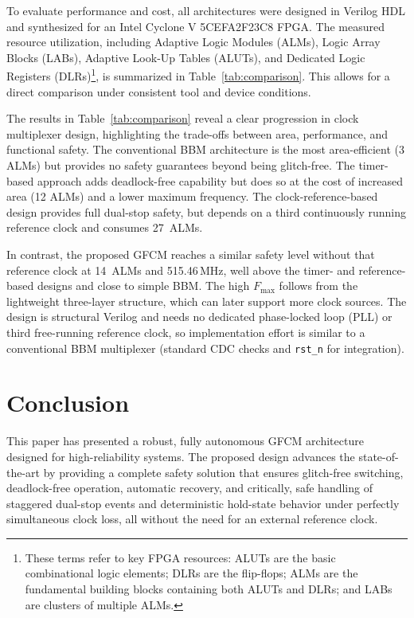 \documentclass[conference]{IEEEtran}
\begin{document}
To evaluate performance and cost, all architectures were designed in Verilog HDL and synthesized for an Intel Cyclone V 5CEFA2F23C8 FPGA. The measured resource utilization, including Adaptive Logic Modules (ALMs), Logic Array Blocks (LABs), Adaptive Look-Up Tables (ALUTs), and Dedicated Logic Registers (DLRs)\footnote{These terms refer to key FPGA resources: ALUTs are the basic combinational logic elements; DLRs are the flip-flops; ALMs are the fundamental building blocks containing both ALUTs and DLRs; and LABs are clusters of multiple ALMs.}, is summarized in Table~\ref{tab:comparison}. This allows for a direct comparison under consistent tool and device conditions.

The results in Table~\ref{tab:comparison} reveal a clear progression in clock multiplexer design, highlighting the trade-offs between area, performance, and functional safety. The conventional BBM architecture \cite{harris2012digital} is the most area-efficient (3 ALMs) but provides no safety guarantees beyond being glitch-free. The timer-based approach \cite{9217816} adds deadlock-free capability but does so at the cost of increased area (12 ALMs) and a lower maximum frequency.
The clock-reference-based design \cite{11424085} provides full dual-stop safety, but depends on a third continuously running reference clock and consumes 27~ALMs.

In contrast, the proposed GFCM reaches a similar safety level without that reference clock at 14~ALMs and 515.46\,MHz, well above the timer- and reference-based designs and close to simple BBM. The high $F_{\max}$ follows from the lightweight three-layer structure, which can later support more clock sources. The design is structural Verilog and needs no dedicated phase-locked loop (PLL) or third free-running reference clock, so implementation effort is similar to a conventional BBM multiplexer (standard CDC checks and \texttt{rst\_n} for integration).

\section{Conclusion}
\label{sec:conclusion}

This paper has presented a robust, fully autonomous GFCM architecture designed for high-reliability systems. The proposed design advances the state-of-the-art by providing a complete safety solution that ensures glitch-free switching, deadlock-free operation, automatic recovery, and critically, safe handling of staggered dual-stop events and deterministic hold-state behavior under perfectly simultaneous clock loss, all without the need for an external reference clock.
\end{document}
